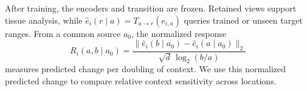 After training, the encoders and transition are frozen. Retained views support tissue analysis, while $\widehat e_i(r\mid a)=T_{a\to r}(e_{i,a})$ queries trained or unseen target ranges. From a common source $a_0$, the normalized response
\begin{equation}
R_i(a,b\mid a_0)=\frac{\|\widehat e_i(b\mid a_0)-\widehat e_i(a\mid a_0)\|_2}
{\sqrt d\,\log_2(b/a)}
\label{eq:granularity-response}
\end{equation}
measures predicted change per doubling of context. We use this normalized predicted change to compare relative context sensitivity across locations.
